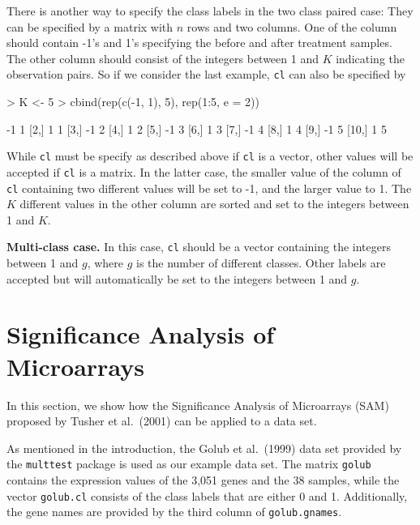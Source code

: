 \documentclass[a4paper]{article}
\begin{document}
There is another way to specify the class labels in the two class paired
case: They can be specified by a matrix with $n$ rows and two columns. One of
the column should contain -1's and 1's specifying the before and after
treatment samples. The other column should consist of the integers between 1
and $K$ indicating the observation pairs. So if we consider the last example,
\texttt{cl} can also be specified by

\begin{Schunk}
\begin{Sinput}
> K <- 5
> cbind(rep(c(-1, 1), 5), rep(1:5, e = 2))
\end{Sinput}
\begin{Soutput}
      [,1] [,2]
 [1,]   -1    1
 [2,]    1    1
 [3,]   -1    2
 [4,]    1    2
 [5,]   -1    3
 [6,]    1    3
 [7,]   -1    4
 [8,]    1    4
 [9,]   -1    5
[10,]    1    5
\end{Soutput}
\end{Schunk}

While \texttt{cl} must be specify as described above if \texttt{cl} is a vector,
other values will be accepted if \texttt{cl} is a matrix. In the latter case, the
smaller value of the column of \texttt{cl} containing two different values will be
set to -1, and the larger value to 1. The $K$ different values in the other column
are sorted and set to the integers between 1 and $K$.

\vspace*{18pt} \noindent \textbf{Multi-class case.} In this case, \texttt{cl} should
be a vector containing the integers between 1 and $g$, where $g$ is the number of different
classes. Other labels are accepted but will automatically be set to the integers between
1 and $g$.


\section{Significance Analysis of Microarrays}

In this section, we show how the Significance Analysis of
Microarrays (SAM) proposed by Tusher et al.\ (2001) can be applied
to a data set.

As mentioned in the introduction, the Golub et al.\ (1999) data
set provided by the \texttt{multtest} package is used as our example
data set. The matrix \texttt{golub} contains the expression values of the
3,051 genes and the 38 samples, while the vector \texttt{golub.cl}
consists of the class labels that are either 0 and 1. Additionally, the gene names
are provided by the third column of \texttt{golub.gnames}.
\end{document}
